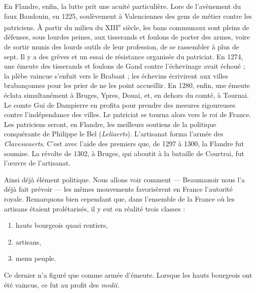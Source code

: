 \documentclass[french,twoside]{book} %
\begin{document}
En Flandre, enfin, la lutte prit une acuité particulière. Lors de l’avènement du faux Baudouin, en 1225, soulèvement à Valenciennes des gens de métier contre les patriciens. À partir du milieu du XIII\textsuperscript{e} siècle, les bans communaux sont pleins de défenses, sous lourdes peines, aux tisserands et foulons de porter des armes, voire de sortir munis des lourds outils de leur profession, de se rassembler à plus de sept. Il y a des grèves et un essai de résistance organisée du patriciat. En 1274, une émeute des tisserands et foulons de Gand contre l’échevinage avait échoué ; la plèbe vaincue s’enfuit vers le Brabant ; les échevins écrivirent aux villes brabançonnes pour les prier de ne les point accueillir. En 1280, enfin, une émeute éclata simultanément à Bruges, Ypres, Douai, et, en dehors du comté, à Tournai. Le comte Gui de Dampierre en profita pour prendre des mesures rigoureuses contre l’indépendance des villes. Le patriciat se tourna alors vers le roi de France. Les patriciens seront, en Flandre, les meilleurs soutiens de la politique conquérante de Philippe le Bel ({\itshape Leliaerts}). L’artisanat forma l’armée des {\itshape Claveswaerts}. C’est avec l’aide des premiers que, de 1297 à 1300, la Flandre fut soumise. La révolte de 1302, à Bruges, qui aboutit à la bataille de Courtrai, fut l’œuvre de l’artisanat.\par
Ainsi déjà élément politique. Nous allons voir comment — Beaumanoir nous l’a déjà fait prévoir — les mêmes mouvements favorisèrent en France l’autorité royale. Remarquons bien cependant que, dans l’ensemble de la France où les artisans étaient prolétarisés, il y eut en réalité trois classes :\par

\begin{enumerate}[itemsep=0pt,]
\item hauts bourgeois quasi rentiers,
\item artisans,
\item menu peuple.

\end{enumerate}\noindent Ce dernier n’a figuré que comme armée d’émeute. Lorsque les hauts bourgeois ont été vaincus, ce fut au profit des {\itshape medii.}
\end{document}
